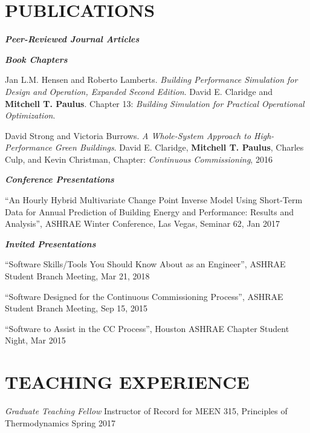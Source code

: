 \documentclass[margin]{res} %
\begin{document}
\begin{resume}
\section{PUBLICATIONS}
{\sl \textbf{Peer-Reviewed Journal Articles}}









{\sl \textbf{Book Chapters}}

Jan L.M. Hensen and Roberto Lamberts. \textit{Building Performance Simulation
for Design and Operation, Expanded Second Edition}. David E. Claridge
and \textbf{Mitchell T. Paulus}. Chapter 13: \textit{Building Simulation
for Practical Operational Optimization}.

David Strong and Victoria Burrows. \textit{A Whole-System Approach to High-Performance Green Buildings}. David E. Claridge, \textbf{Mitchell T. Paulus}, Charles Culp, and Kevin Christman, Chapter: \textit{Continuous Commissioning\textsuperscript{\textregistered{}}}, 2016

\textbf{\textit{Conference Presentations}}

``An Hourly Hybrid Multivariate Change Point Inverse  Model Using Short-Term Data for Annual Prediction of Building Energy and Performance: Results and Analysis'', ASHRAE Winter Conference, Las Vegas, Seminar 62, Jan 2017

\textbf{\textit{Invited Presentations}}

``Software Skills/Tools You Should Know About as an Engineer'', ASHRAE Student Branch Meeting, Mar 21, 2018

``Software Designed for the Continuous Commissioning Process'', ASHRAE Student Branch Meeting, Sep 15, 2015

``Software to Assist in the CC Process'', Houston ASHRAE Chapter Student Night, Mar 2015

\section{TEACHING EXPERIENCE}
{\sl Graduate Teaching Fellow }\newline
Instructor of Record for MEEN 315, Principles of Thermodynamics \hfill Spring 2017


\end{resume}
\end{document}
